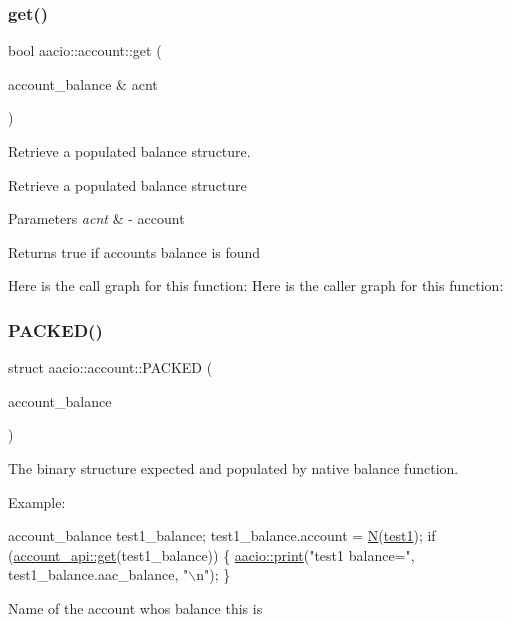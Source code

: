 \subsubsection{\texorpdfstring{get()}{get()}}
{\footnotesize\ttfamily bool aacio\+::account\+::get (\begin{DoxyParamCaption}\item[{account\+\_\+balance \&}]{acnt }\end{DoxyParamCaption})}



Retrieve a populated balance structure. 

Retrieve a populated balance structure 
\begin{DoxyParams}{Parameters}
{\em acnt} & -\/ account \\
\hline
\end{DoxyParams}
\begin{DoxyReturn}{Returns}
true if account\textquotesingle{}s balance is found 
\end{DoxyReturn}
Here is the call graph for this function\+:
Here is the caller graph for this function\+:
\mbox{\label{group__accountcppapi_ga12342e761e2d66157d0f5dd9494cef06}} 
\subsubsection{\texorpdfstring{P\+A\+C\+K\+E\+D()}{PACKED()}}
{\footnotesize\ttfamily struct aacio\+::account\+::\+P\+A\+C\+K\+ED (\begin{DoxyParamCaption}\item[{account\+\_\+balance}]{ }\end{DoxyParamCaption})}



The binary structure expected and populated by native balance function. 

Example\+: 
\begin{DoxyCode}
account\_balance test1\_balance;
test1\_balance.account = \mbox{\hyperlink{group__types_gaf9c1edb0e0da55ec6ba09f32f6839529}{N}}(\mbox{\hyperlink{namespacetest1}{test1}});
\textcolor{keywordflow}{if} (\mbox{\hyperlink{group__accountcppapi_ga1f55ade0cb1bd173ca8eaf88ac60dff9}{account\_api::get}}(test1\_balance))
\{
   \mbox{\hyperlink{group__console_cppapi_ga2780132b8484a2674ef9254699d12968}{aacio::print}}(\textcolor{stringliteral}{"test1 balance="}, test1\_balance.aac\_balance, \textcolor{stringliteral}{"\(\backslash\)n"});
\}
\end{DoxyCode}
 Name of the account who\textquotesingle{}s balance this is

